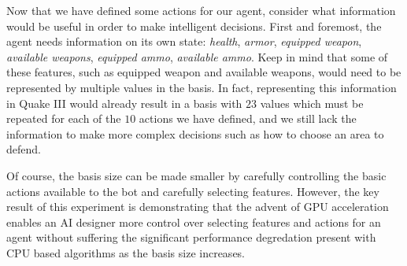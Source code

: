 Now that we have defined some actions for our agent, consider what information would be useful in order to make intelligent decisions. First and foremost, the agent needs information on its own state: \emph{health}, \emph{armor}, \emph{equipped weapon}, \emph{available weapons}, \emph{equipped ammo}, \emph{available ammo}. Keep in mind that some of these features, such as equipped weapon and available weapons, would need to be represented by multiple values in the basis. In fact, representing this information in Quake III would already result in a basis with $23$ values which must be repeated for each of the $10$ actions we have defined, and we still lack the information to make more complex decisions such as how to choose an area to defend.

Of course, the basis size can be made smaller by carefully controlling the basic actions available to the bot and carefully selecting features. However, the key result of this experiment is demonstrating that the advent of GPU acceleration enables an AI designer more control over selecting features and actions for an agent without suffering the significant performance degredation present with CPU based algorithms as the basis size increases.